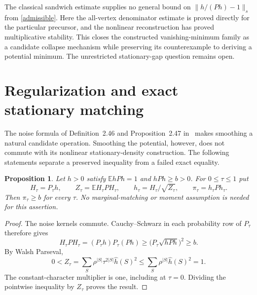 \documentclass[11pt]{article}
\newcommand{\E}{\mathbb E}
\newtheorem{proposition}[theorem]{Proposition}
\begin{document}
The classical sandwich estimate supplies no general bound on
$\|h/(Ph)-1\|_s$ from \eqref{admissible}. Here the all-vertex
denominator estimate is proved directly for the particular precursor,
and the nonlinear reconstruction has proved multiplicative stability.
This closes the constructed vanishing-minimum family as a candidate
collapse mechanism while preserving its counterexample to deriving a
potential minimum. The unrestricted stationary-gap question remains open.


\section{Regularization and exact stationary matching}\label{regularization}
The noise formula of Definition~2.46 and Proposition~2.47
in~\cite{odonnell} makes smoothing a natural candidate operation.
Smoothing the potential, however, does not commute with its nonlinear
stationary-density construction. The following statements separate a
preserved inequality from a failed exact equality.

\begin{proposition}\label{smoothingfloor}
Let $h>0$ satisfy $\E hPh=1$ and $hPh\geq b>0$. For $0\leq\tau\leq1$ put
\[
 H_\tau=P_\tau h,\qquad Z_\tau=\E H_\tau P H_\tau,\qquad
 h_\tau=H_\tau/\sqrt{Z_\tau},\qquad \pi_\tau=h_\tau P h_\tau.
\]
Then $\pi_\tau\geq b$ for every $\tau$. No marginal-matching or moment
assumption is needed for this assertion.
\end{proposition}
\begin{proof}
The noise kernels commute. Cauchy--Schwarz in each probability row of
$P_\tau$ therefore gives
\[
 H_\tau P H_\tau=(P_\tau h)P_\tau(Ph)
 \geq\bigl(P_\tau\sqrt{hPh}\bigr)^2\geq b.
\]
By Walsh Parseval,
\[
 0<Z_\tau=\sum_S\rho^{|S|}\tau^{2|S|}\widehat h(S)^2
 \leq\sum_S\rho^{|S|}\widehat h(S)^2=1.
\]
The constant-character multiplier is one, including at $\tau=0$.
Dividing the pointwise inequality by $Z_\tau$ proves the result.
\end{proof}
\end{document}
